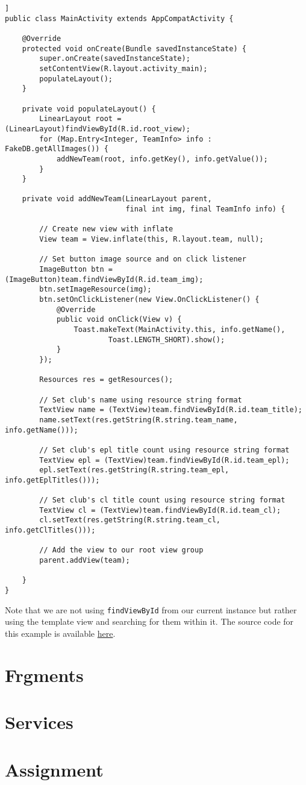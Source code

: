 \begin{lstlisting}[style=A_Java, caption={Layout inflation in Java}, label={listing:javainfl}]]
public class MainActivity extends AppCompatActivity {

    @Override
    protected void onCreate(Bundle savedInstanceState) {
        super.onCreate(savedInstanceState);
        setContentView(R.layout.activity_main);
        populateLayout();
    }

    private void populateLayout() {
        LinearLayout root = (LinearLayout)findViewById(R.id.root_view);
        for (Map.Entry<Integer, TeamInfo> info : FakeDB.getAllImages()) {
            addNewTeam(root, info.getKey(), info.getValue());
        }
    }

    private void addNewTeam(LinearLayout parent,
                            final int img, final TeamInfo info) {

        // Create new view with inflate
        View team = View.inflate(this, R.layout.team, null);

        // Set button image source and on click listener
        ImageButton btn = (ImageButton)team.findViewById(R.id.team_img);
        btn.setImageResource(img);
        btn.setOnClickListener(new View.OnClickListener() {
            @Override
            public void onClick(View v) {
                Toast.makeText(MainActivity.this, info.getName(),
                        Toast.LENGTH_SHORT).show();
            }
        });

        Resources res = getResources();

        // Set club's name using resource string format
        TextView name = (TextView)team.findViewById(R.id.team_title);
        name.setText(res.getString(R.string.team_name, info.getName()));

        // Set club's epl title count using resource string format
        TextView epl = (TextView)team.findViewById(R.id.team_epl);
        epl.setText(res.getString(R.string.team_epl, info.getEplTitles()));

        // Set club's cl title count using resource string format
        TextView cl = (TextView)team.findViewById(R.id.team_cl);
        cl.setText(res.getString(R.string.team_cl, info.getClTitles()));

        // Add the view to our root view group
        parent.addView(team);

    }
}
\end{lstlisting}

Note that we are not using \texttt{findViewById} from our current instance but rather using the template view and searching for them within it. The source code for this example is available \href{https://github.com/JonSteinn/AndroidDevelopment/tree/master/examples/lab3/inflator}{here}.

\section{Frgments}

\section{Services}

\section{Assignment}
